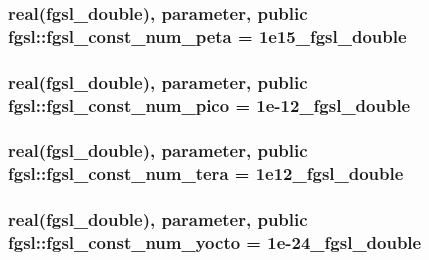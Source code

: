 \subsubsection[{fgsl\+\_\+const\+\_\+num\+\_\+peta}]{\setlength{\rightskip}{0pt plus 5cm}real({\bf fgsl\+\_\+double}), parameter, public fgsl\+::fgsl\+\_\+const\+\_\+num\+\_\+peta = 1e15\+\_\+fgsl\+\_\+double}\label{namespacefgsl_aa124eb86407291ed14158b0802d02029}
\hypertarget{namespacefgsl_a8a137e17b45fbfd8a37ef012e9b522ab}{}
\subsubsection[{fgsl\+\_\+const\+\_\+num\+\_\+pico}]{\setlength{\rightskip}{0pt plus 5cm}real({\bf fgsl\+\_\+double}), parameter, public fgsl\+::fgsl\+\_\+const\+\_\+num\+\_\+pico = 1e-\/12\+\_\+fgsl\+\_\+double}\label{namespacefgsl_a8a137e17b45fbfd8a37ef012e9b522ab}
\hypertarget{namespacefgsl_a6b39aa71fe2d5af7fa748710f70afd58}{}
\subsubsection[{fgsl\+\_\+const\+\_\+num\+\_\+tera}]{\setlength{\rightskip}{0pt plus 5cm}real({\bf fgsl\+\_\+double}), parameter, public fgsl\+::fgsl\+\_\+const\+\_\+num\+\_\+tera = 1e12\+\_\+fgsl\+\_\+double}\label{namespacefgsl_a6b39aa71fe2d5af7fa748710f70afd58}
\hypertarget{namespacefgsl_a97bcc951d0797621c0a06cb1d63cad49}{}
\subsubsection[{fgsl\+\_\+const\+\_\+num\+\_\+yocto}]{\setlength{\rightskip}{0pt plus 5cm}real({\bf fgsl\+\_\+double}), parameter, public fgsl\+::fgsl\+\_\+const\+\_\+num\+\_\+yocto = 1e-\/24\+\_\+fgsl\+\_\+double}\label{namespacefgsl_a97bcc951d0797621c0a06cb1d63cad49}
\hypertarget{namespacefgsl_a0b9812de1b4fd0e830437a0f81756409}{}
